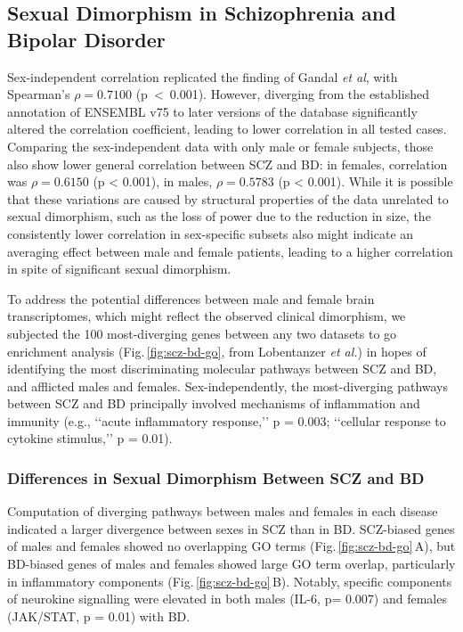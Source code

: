 \subsection{Sexual Dimorphism in Schizophrenia and Bipolar Disorder}
Sex-independent correlation replicated the finding of Gandal \emph{et al},\cite{Gandal2018} with Spearman's $\rho = 0.7100$ \mbox{(p < 0.001)}. However, diverging from the established annotation of ENSEMBL v75 to later versions of the database significantly altered the correlation coefficient, leading to lower correlation in all tested cases. Comparing the sex-independent data with only male or female subjects, those also show lower general correlation between SCZ and BD: in females, correlation was $\rho = 0.6150$ (p < 0.001), in males, $\rho = 0.5783$ (p < 0.001). While it is possible that these variations are caused by structural properties of the data unrelated to sexual dimorphism, such as the loss of power due to the reduction in size, the consistently lower correlation in sex-specific subsets also might indicate an averaging effect between male and female patients, leading to a higher correlation in spite of significant sexual dimorphism.

 To address the potential differences between male and female brain transcriptomes, which might reflect the observed clinical dimorphism, we subjected the 100 most-diverging genes between any two datasets to \ac{go} enrichment analysis (Fig.\,\ref{fig:scz-bd-go}, from Lobentanzer \emph{et al.}\cite{Lobentanzer2019a}) in hopes of identifying the most discriminating molecular pathways between SCZ and BD, and afflicted males and females. Sex-independently, the most-diverging pathways between SCZ and BD principally involved mechanisms of inflammation and immunity (e.g., ‘‘acute inflammatory response,’’ p = 0.003; ‘‘cellular response to cytokine stimulus,’’ p = 0.01).

\subsubsection{Differences in Sexual Dimorphism Between SCZ and BD}
Computation of diverging pathways between males and females in each disease indicated a larger divergence between sexes in SCZ than in BD. SCZ-biased genes of males and females showed no overlapping GO terms (Fig.\,\ref{fig:scz-bd-go}\,A), but BD-biased genes of males and females showed large GO term overlap, particularly in inflammatory components (Fig.\,\ref{fig:scz-bd-go}\,B). Notably, specific components of neurokine signalling were elevated in both males (IL-6, p= 0.007) and females (JAK/STAT, p = 0.01) with BD.

